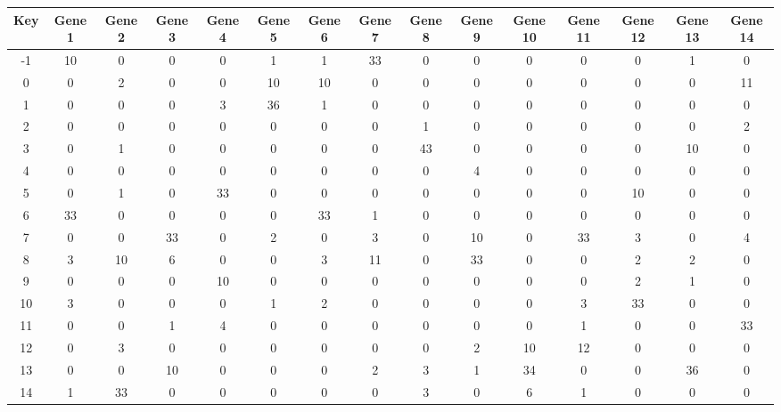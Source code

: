 \begin{tabular}{|c|c|c|c|c|c|c|c|c|c|c|c|c|c|c|}
\hline
Key & Gene 1 & Gene 2 & Gene 3 & Gene 4 & Gene 5 & Gene 6 & Gene 7 & Gene 8 & Gene 9 & Gene 10 & Gene 11 & Gene 12 & Gene 13 & Gene 14 \\
\hline
-1 & 10 & 0 & 0 & 0 & 1 & 1 & 33 & 0 & 0 & 0 & 0 & 0 & 1 & 0 \\
0 & 0 & 2 & 0 & 0 & 10 & 10 & 0 & 0 & 0 & 0 & 0 & 0 & 0 & 11 \\
1 & 0 & 0 & 0 & 3 & 36 & 1 & 0 & 0 & 0 & 0 & 0 & 0 & 0 & 0 \\
2 & 0 & 0 & 0 & 0 & 0 & 0 & 0 & 1 & 0 & 0 & 0 & 0 & 0 & 2 \\
3 & 0 & 1 & 0 & 0 & 0 & 0 & 0 & 43 & 0 & 0 & 0 & 0 & 10 & 0 \\
4 & 0 & 0 & 0 & 0 & 0 & 0 & 0 & 0 & 4 & 0 & 0 & 0 & 0 & 0 \\
5 & 0 & 1 & 0 & 33 & 0 & 0 & 0 & 0 & 0 & 0 & 0 & 10 & 0 & 0 \\
6 & 33 & 0 & 0 & 0 & 0 & 33 & 1 & 0 & 0 & 0 & 0 & 0 & 0 & 0 \\
7 & 0 & 0 & 33 & 0 & 2 & 0 & 3 & 0 & 10 & 0 & 33 & 3 & 0 & 4 \\
8 & 3 & 10 & 6 & 0 & 0 & 3 & 11 & 0 & 33 & 0 & 0 & 2 & 2 & 0 \\
9 & 0 & 0 & 0 & 10 & 0 & 0 & 0 & 0 & 0 & 0 & 0 & 2 & 1 & 0 \\
10 & 3 & 0 & 0 & 0 & 1 & 2 & 0 & 0 & 0 & 0 & 3 & 33 & 0 & 0 \\
11 & 0 & 0 & 1 & 4 & 0 & 0 & 0 & 0 & 0 & 0 & 1 & 0 & 0 & 33 \\
12 & 0 & 3 & 0 & 0 & 0 & 0 & 0 & 0 & 2 & 10 & 12 & 0 & 0 & 0 \\
13 & 0 & 0 & 10 & 0 & 0 & 0 & 2 & 3 & 1 & 34 & 0 & 0 & 36 & 0 \\
14 & 1 & 33 & 0 & 0 & 0 & 0 & 0 & 3 & 0 & 6 & 1 & 0 & 0 & 0 \\
\hline
\end{tabular}